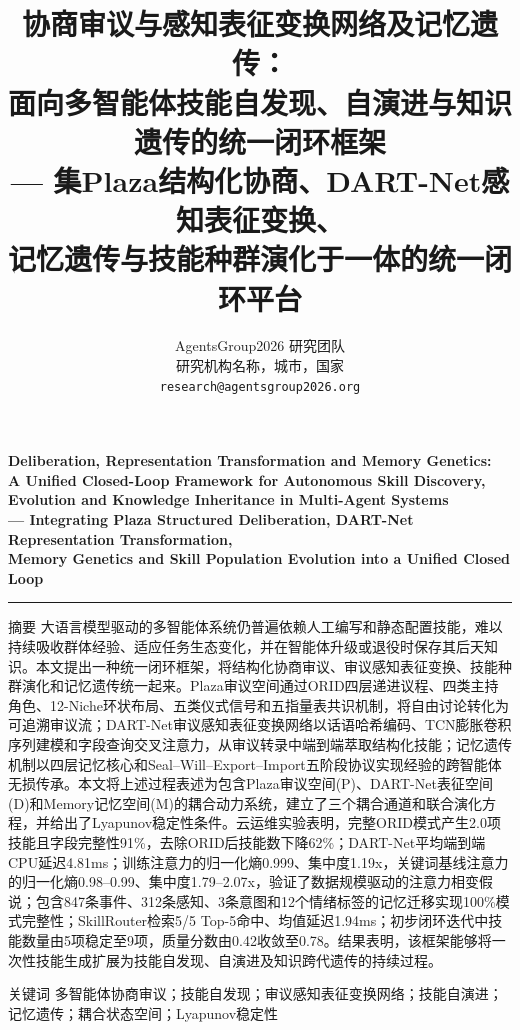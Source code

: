 \documentclass[12pt,a4paper]{ctexart}
\title{\zihao{2}\heiti 协商审议与感知表征变换网络及记忆遗传：\\
        面向多智能体技能自发现、自演进与知识遗传的统一闭环框架\\
        \vspace{6pt}
        {\zihao{4}\heiti --- 集Plaza结构化协商、DART-Net感知表征变换、\\记忆遗传与技能种群演化于一体的统一闭环平台}}
\author{
  \zihao{4} AgentsGroup2026 研究团队 \\[4pt]
  \zihao{-5} 研究机构名称，城市，国家 \\[2pt]
  \zihao{-5} \texttt{research@agentsgroup2026.org}
}
\date{}
\begin{document}
\maketitle

\begin{center}
  {\bfseries Deliberation, Representation Transformation and Memory Genetics:\\[2pt]
  A Unified Closed-Loop Framework for Autonomous Skill Discovery,\\ Evolution and Knowledge Inheritance in Multi-Agent Systems\\[4pt]
  \kaishu --- Integrating Plaza Structured Deliberation, DART-Net Representation Transformation,\\
  Memory Genetics and Skill Population Evolution into a Unified Closed Loop}
\end{center}

\vspace{12pt}
\hrule
\vspace{12pt}

{\heiti{} 摘\quad 要\quad}
{\kaishu{}
大语言模型驱动的多智能体系统仍普遍依赖人工编写和静态配置技能，难以持续吸收群体经验、适应任务生态变化，并在智能体升级或退役时保存其后天知识。本文提出一种统一闭环框架，将结构化协商审议、审议感知表征变换、技能种群演化和记忆遗传统一起来。Plaza审议空间通过ORID四层递进议程、四类主持角色、12-Niche环状布局、五类仪式信号和五指量表共识机制，将自由讨论转化为可追溯审议流；DART-Net审议感知表征变换网络以话语哈希编码、TCN膨胀卷积序列建模和字段查询交叉注意力，从审议转录中端到端萃取结构化技能；记忆遗传机制以四层记忆核心和Seal--Will--Export--Import五阶段协议实现经验的跨智能体无损传承。本文将上述过程表述为包含Plaza审议空间(P)、DART-Net表征空间(D)和Memory记忆空间(M)的耦合动力系统，建立了三个耦合通道和联合演化方程，并给出了Lyapunov稳定性条件。云运维实验表明，完整ORID模式产生2.0项技能且字段完整性91\%，去除ORID后技能数下降62\%；DART-Net平均端到端CPU延迟4.81ms；训练注意力的归一化熵0.999、集中度1.19x，关键词基线注意力的归一化熵0.98--0.99、集中度1.79--2.07x，验证了数据规模驱动的注意力相变假说；包含847条事件、312条感知、3条意图和12个情绪标签的记忆迁移实现100\%模式完整性；SkillRouter检索5/5 Top-5命中、均值延迟1.94ms；初步闭环迭代中技能数量由5项稳定至9项，质量分数由0.42收敛至0.78。结果表明，该框架能够将一次性技能生成扩展为技能自发现、自演进及知识跨代遗传的持续过程。
}

\vspace{6pt}
{\heiti{} 关键词\quad}{\kaishu{} 多智能体协商审议；技能自发现；审议感知表征变换网络；技能自演进；记忆遗传；耦合状态空间；Lyapunov稳定性}
\end{document}
